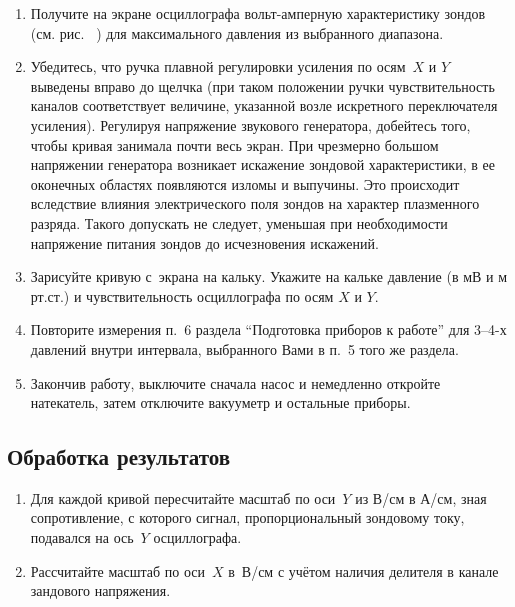 \begin{lab:task}
\begin{enumerate}
\item Получите на экране осциллографа вольт-амперную характеристику зондов (см. рис.~%
) для максимального давления из выбранного диапазона.

\item Убедитесь, что ручка плавной регулировки усиления по осям~$X$ и $Y$ выведены вправо до щелчка (при таком положении ручки
чувствительность каналов соответствует величине, указанной возле искретного переключателя усиления). Регулируя напряжение звукового
генератора, добейтесь того, чтобы кривая занимала почти весь экран. При чрезмерно большом напряжении генератора возникает искажение зондовой характеристики, в ее оконечных областях появляются изломы и выпучины. Это происходит вследствие влияния электрического поля зондов на характер плазменного разряда. Такого допускать не следует, уменьшая при необходимости напряжение питания зондов до исчезновения искажений.

\item Зарисуйте кривую с~экрана на кальку. Укажите на
кальке давление (в мВ и м рт.ст.) и чувствительность осциллографа по осям $X$ и $Y$.

\item Повторите измерения п.~6 раздела ``Подготовка приборов к работе'' для 3--4-х давлений внутри интервала, выбранного Вами в п.~5 того же раздела.

\item Закончив работу, выключите сначала насос и немедленно откройте натекатель, затем отключите вакууметр и остальные приборы.

\end{enumerate}

\subsection*{Обработка результатов}

\begin{enumerate}

\item Для каждой кривой пересчитайте масштаб по оси~$Y$ из В/см в А/см, зная сопротивление, с которого сигнал,
пропорциональный зондовому току, подавался на ось~$Y$ осциллографа.

\item Рассчитайте масштаб по оси~$X$ в~В/см с учётом наличия делителя в канале зандового напряжения.


\end{enumerate}
\end{lab:task}
